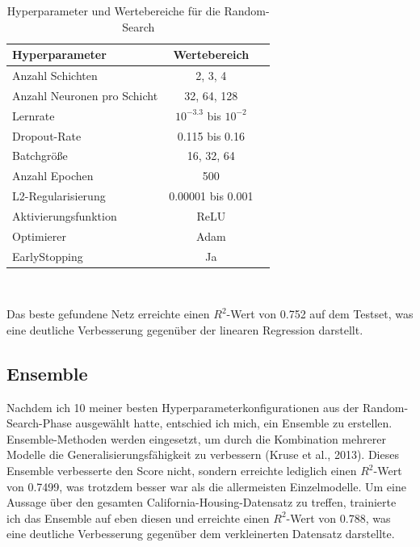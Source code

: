 \documentclass[9pt,a4paper,twocolumn,twoside]{tau-class/tau}
\begin{document}
\begin{table}[ht]
    \centering
    \begin{tabular}{@{}lcc@{}}
        \toprule
        Hyperparameter & Wertebereich
        \\ \midrule
        Anzahl Schichten & 2, 3, 4 \\
        Anzahl Neuronen pro Schicht & 32, 64, 128 \\
        Lernrate & $10^{-3.3}$ bis $10^{-2}$ \\
        Dropout-Rate & 0.115 bis 0.16 \\
        Batchgröße & 16, 32, 64 \\
        Anzahl Epochen & 500 \\
        L2-Regularisierung & 0.00001 bis 0.001 \\
        Aktivierungsfunktion & ReLU \\
        Optimierer & Adam \\
        EarlyStopping & Ja \\
        \bottomrule
    \end{tabular}
    \\
    \caption{Hyperparameter und Wertebereiche für die Random-Search}
    \label{tab:hyperparameters_2}
\end{table}

Das beste gefundene Netz erreichte einen $R^2$-Wert von 0.752 auf dem Testset, was eine deutliche Verbesserung gegenüber der linearen Regression darstellt.


\subsection{Ensemble}
Nachdem ich 10 meiner besten Hyperparameterkonfigurationen aus der Random-Search-Phase ausgewählt hatte, entschied ich mich, ein Ensemble zu erstellen.
Ensemble-Methoden werden eingesetzt, um durch die Kombination mehrerer Modelle die Generalisierungsfähigkeit zu verbessern (Kruse et al., 2013).
Dieses Ensemble verbesserte den Score nicht, sondern erreichte lediglich einen $R^2$-Wert von 0.7499, was trotzdem besser war als die allermeisten Einzelmodelle.
Um eine Aussage über den gesamten California-Housing-Datensatz zu treffen, trainierte ich das Ensemble auf eben diesen und erreichte einen $R^2$-Wert von 0.788, was eine deutliche Verbesserung gegenüber dem verkleinerten Datensatz darstellte.
\end{document}
